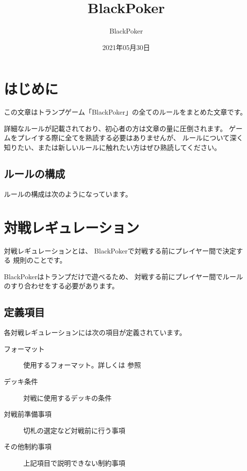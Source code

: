 \documentclass[letterpaper,10pt,dvipdfmx]{sphinxmanual}
\title{BlackPoker}
\date{2021年05月30日}
\author{BlackPoker}
\begin{document}
\pagestyle{empty}
\sphinxmaketitle
\pagestyle{plain}
\sphinxtableofcontents
\pagestyle{normal}
\label{\detokenize{index::doc}}



\chapter{はじめに}
\label{\detokenize{init/init:id1}}\label{\detokenize{init/init::doc}}
この文章はトランプゲーム「BlackPoker」の全てのルールをまとめた文章です。

詳細なルールが記載されており、初心者の方は文章の量に圧倒されます。
ゲームをプレイする際に全てを熟読する必要はありませんが、
ルールについて深く知りたい、または新しいルールに触れたい方はぜひ熟読してください。


\section{ルールの構成}
\label{\detokenize{init/init:id2}}
ルールの構成は次のようになっています。

\noindent{}


\chapter{対戦レギュレーション}
\label{\detokenize{match-regulations/match-regulations:id1}}\label{\detokenize{match-regulations/match-regulations::doc}}
対戦レギュレーションとは、
BlackPokerで対戦する前にプレイヤー間で決定する
規則のことです。

BlackPokerはトランプだけで遊べるため、
対戦する前にプレイヤー間でルールのすり合わせをする必要があります。


\section{定義項目}
\label{\detokenize{match-regulations/match-regulations:id2}}
各対戦レギュレーションには次の項目が定義されています。
\begin{description}
\item[{フォーマット}] \leavevmode
使用するフォーマット。詳しくは {\hyperref[\detokenize{format/format::doc}]{}} 参照

\item[{デッキ条件}] \leavevmode
対戦に使用するデッキの条件

\item[{対戦前準備事項}] \leavevmode
切札の選定など対戦前に行う事項

\item[{その他制約事項}] \leavevmode
上記項目で説明できない制約事項

\end{description}
\end{document}

